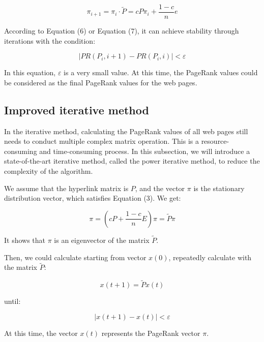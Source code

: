 \documentclass[lettersize,journal,12pt,conference]{IEEEtran}
\begin{document}
\begin{equation}
	\label{eq:7}
	\pi_{i+1} = \pi_i \cdot \widetilde{P} = cP\pi_i + \frac{1 - c}{n} e
\end{equation}

According to Equation (6) or Equation (7), it can achieve stability through iterations with the condition:

\begin{equation}
	\label{eq:8}
	|PR(P_i, i+1) - PR(P_i, i)| < \varepsilon
\end{equation}
 
In this equation, \(\varepsilon\) is a very small value. At this time, the PageRank values could be considered as the final PageRank values for the web pages.

\subsection{Improved iterative method}

In the iterative method, calculating the PageRank values of all web pages still needs to conduct multiple complex matrix operation. This is a resource-consuming and time-consuming process. In this subsection, we will introduce a state-of-the-art iterative method, called the power iterative method, to reduce the complexity of the algorithm.

We assume that the hyperlink matrix is $P$, and the vector $\pi$ is the stationary distribution vector, which satisfies Equation (3). We get: 

\begin{equation}
	\label{eq:9}
	\pi = (cP + \frac{1 - c}{n}E)\pi = \widetilde{P}\pi
\end{equation}

It shows that $\pi$ is an eigenvector of the matrix $\widetilde{P}$.

Then, we could calculate starting from vector $x(0)$, repeatedly calculate with the matrix $\widetilde{P}$: 

\begin{equation}
	\label{eq:10}
	x(t+1) = \widetilde{P}x(t)
\end{equation}

until:

\begin{equation}
	\label{eq:11}
	|x(t+1) - x(t)| < \varepsilon
\end{equation}

At this time, the vector $x(t)$ represents the PageRank vector $\pi$.
\end{document}

